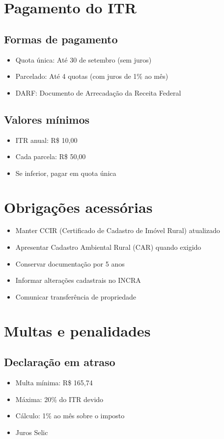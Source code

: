 \documentclass[12pt,a4paper]{article}
\begin{document}
\section{Pagamento do ITR}

\subsection{Formas de pagamento}
\begin{itemize}
    \item Quota única: Até 30 de setembro (sem juros)
    \item Parcelado: Até 4 quotas (com juros de 1\% ao mês)
    \item DARF: Documento de Arrecadação da Receita Federal
\end{itemize}

\subsection{Valores mínimos}
\begin{itemize}
    \item ITR anual: R\$ 10,00
    \item Cada parcela: R\$ 50,00
    \item Se inferior, pagar em quota única
\end{itemize}

\section{Obrigações acessórias}

\begin{itemize}
    \item Manter CCIR (Certificado de Cadastro de Imóvel Rural) atualizado
    \item Apresentar Cadastro Ambiental Rural (CAR) quando exigido
    \item Conservar documentação por 5 anos
    \item Informar alterações cadastrais no INCRA
    \item Comunicar transferência de propriedade
\end{itemize}

\section{Multas e penalidades}

\subsection{Declaração em atraso}
\begin{itemize}
    \item Multa mínima: R\$ 165,74
    \item Máxima: 20\% do ITR devido
    \item Cálculo: 1\% ao mês sobre o imposto
    \item Juros Selic
\end{itemize}
\end{document}
